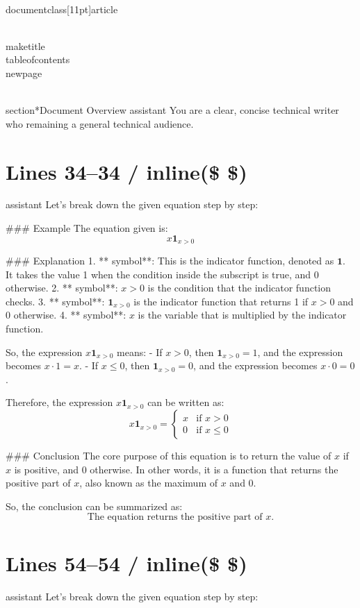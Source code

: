 \\documentclass[11pt]{article}
\begin{document}
\\maketitle
\\tableofcontents
\\newpage

\\section*{Document Overview}
assistant
You are a clear, concise technical writer who remaining a general technical audience.

\newpage

\section*{Lines 34–34 / inline(\$ \$) }
assistant
Let's break down the given equation step by step:

### Example
The equation given is:
\[ x\mathbf{1}_{x>0} \]

### Explanation
1. ** symbol**: This is the indicator function, denoted as \(\mathbf{1}\). It takes the value 1 when the condition inside the subscript is true, and 0 otherwise.
2. ** symbol**: \(x > 0\) is the condition that the indicator function checks.
3. ** symbol**: \(\mathbf{1}_{x>0}\) is the indicator function that returns 1 if \(x > 0\) and 0 otherwise.
4. ** symbol**: \(x\) is the variable that is multiplied by the indicator function.

So, the expression \(x\mathbf{1}_{x>0}\) means:
- If \(x > 0\), then \(\mathbf{1}_{x>0} = 1\), and the expression becomes \(x \cdot 1 = x\).
- If \(x \leq 0\), then \(\mathbf{1}_{x>0} = 0\), and the expression becomes \(x \cdot 0 = 0\).

Therefore, the expression \(x\mathbf{1}_{x>0}\) can be written as:
\[ x\mathbf{1}_{x>0} = \begin{cases} 
x & \text{if } x > 0 \\
0 & \text{if } x \leq 0 
\end{cases} \]

### Conclusion
The core purpose of this equation is to return the value of \(x\) if \(x\) is positive, and 0 otherwise. In other words, it is a function that returns the positive part of \(x\), also known as the maximum of \(x\) and 0.

So, the conclusion can be summarized as:
\[ \boxed{\text{The equation returns the positive part of } x.} \]


\section*{Lines 54–54 / inline(\$ \$) }
assistant
Let's break down the given equation step by step:
\end{document}
